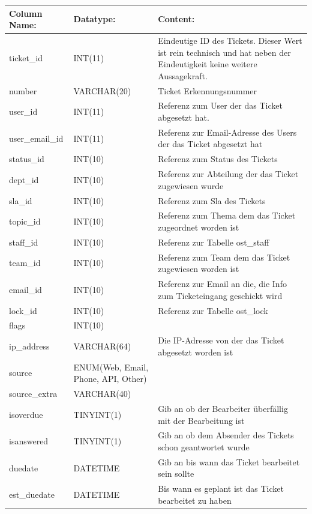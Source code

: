\begin{table}[h]
	\begin{tabular}{|p{3cm}|p{4cm}|p{7.7cm}|}
		\hline
		\textbf{Column Name:} & \textbf{Datatype:} & \textbf{Content:}\\
		\hline
		ticket\_id & INT(11) & Eindeutige ID des Tickets. Dieser Wert ist rein technisch und hat  neben der Eindeutigkeit keine weitere 
		Aussagekraft.\\
		\hline
		number & VARCHAR(20) & Ticket Erkennungsnummer \\
		\hline
		user\_id & INT(11) & Referenz zum User der das Ticket abgesetzt hat.\\
		\hline
		user\_email\_id & INT(11) & Referenz zur Email-Adresse des Users der das Ticket abgesetzt hat\\
		\hline
		status\_id & INT(10) & Referenz zum Status des Tickets\\
		\hline
		dept\_id & INT(10) &  Referenz zur Abteilung der das Ticket zugewiesen wurde\\
		\hline
		sla\_id & INT(10) & Referenz zum Sla des Tickets\\
		\hline
		topic\_id & INT(10) & Referenz zum Thema dem das Ticket zugeordnet worden ist\\
		\hline
		staff\_id & INT(10) & Referenz zur Tabelle ost\_staff \\
		\hline
		team\_id & INT(10) & Referenz zum Team dem das Ticket zugewiesen worden ist \\
		\hline
		email\_id & INT(10) & Referenz zur Email an die, die Info zum Ticketeingang geschickt wird \\
		\hline
		lock\_id & INT(10) & Referenz zur Tabelle ost\_lock \\
		\hline
		flags & INT(10) &  \\
		\hline
		ip\_address & VARCHAR(64) & Die IP-Adresse von der das Ticket abgesetzt worden ist \\
		\hline
		source & ENUM(Web, Email, Phone, API, Other) &\\
		\hline
		source\_extra & VARCHAR(40)&\\
		\hline
		isoverdue & TINYINT(1) & Gib an ob der Bearbeiter überfällig mit der Bearbeitung ist\\
		\hline
		isanswered & TINYINT(1) & Gib an ob dem Absender des Tickets schon geantwortet wurde\\
		\hline
		duedate & DATETIME & Gib an bis wann das Ticket bearbeitet sein sollte\\
		\hline
		est\_duedate & DATETIME & Bis wann es geplant ist das Ticket bearbeitet zu haben \\

\end{tabular}
\end{table}
